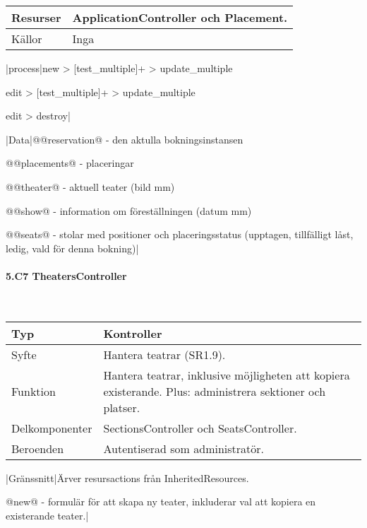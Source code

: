 \documentclass[a4paper, twoside, 11pt, titlepage]{article}
\begin{document}
			\begin {table} [ht] \begin{tabular} {  p{3.5cm} p{9.6cm} }
				\hline
				Resurser & ApplicationController och Placement.  \\
				\hline
				Källor & Inga  \\
				\hline
			\end{tabular} \end{table} \FloatBarrier
			\vspace{6mm}

			|process|new > [test\_multiple]+ > update\_multiple

			edit > [test\_multiple]+ > update\_multiple

			edit > destroy|

			|Data|@@reservation@ - den aktulla bokningsinstansen

			@@placements@ - placeringar

			@@theater@ - aktuell teater (bild mm)

			@@show@ - information om föreställningen (datum mm)

			@@seats@ - stolar med positioner och placeringsstatus (upptagen, tillfälligt låst, ledig, vald för denna bokning)|

			\paragraph{5.C7 TheatersController}\

			\begin {table} [ht] \begin{tabular} {  p{3.5cm} p{9.6cm} }
				\hline
				Typ & Kontroller  \\
				\hline
				Syfte & Hantera teatrar (SR1.9).  \\
				\hline
				Funktion & Hantera teatrar, inklusive möjligheten att kopiera existerande. Plus: administrera sektioner och platser.  \\
				\hline
				Delkomponenter & SectionsController och SeatsController.  \\
				\hline
				Beroenden & Autentiserad som administratör.  \\
				\hline
			\end{tabular} \end{table} \FloatBarrier
			\vspace{6mm}

			|Gränssnitt|Ärver resursactions från InheritedResources.

			@new@ - formulär för att skapa ny teater, inkluderar val att kopiera en existerande teater.|
\end{document}
